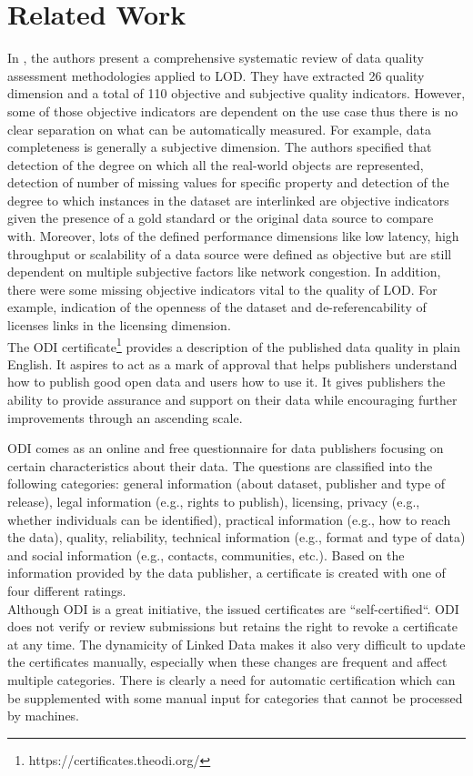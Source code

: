 \documentclass[onecolumn, crcready]{iosart2c}
\begin{document}
\section{Related Work}

In \cite{Framework2012}, the authors present a comprehensive systematic review of data quality assessment methodologies applied to LOD. They have extracted 26 quality dimension and a total of 110 objective and subjective quality indicators. However, some of those objective indicators are dependent on the use case thus there is no clear separation on what can be automatically measured. For example, data completeness is generally a subjective dimension. The authors specified that detection of the degree on which all the real-world objects are represented, detection of number of missing values for specific property and detection of the degree to which instances in the dataset are interlinked are objective indicators given the presence of a gold standard or the original data source to compare with. Moreover, lots of the defined performance dimensions like low latency, high throughput or scalability of a data source were defined as objective but are still dependent on multiple subjective factors like network congestion. In addition, there were some missing objective indicators vital to the quality of LOD. For example, indication of the openness of the dataset and de-referencability of licenses links in the licensing dimension.\\

The ODI certificate\footnote {https://certificates.theodi.org/} provides a description of the published data quality in plain English. It aspires to act as a mark of approval that helps publishers understand how to publish good open data and users how to use it. It gives publishers the ability to provide assurance and support on their data while encouraging further improvements through an ascending scale.

ODI comes as an online and free questionnaire for data publishers focusing on certain characteristics about their data. The questions are classified into the following categories: general information (about dataset, publisher and type of release), legal information (e.g., rights to publish), licensing, privacy (e.g., whether individuals can be identified), practical information (e.g., how to reach the data), quality, reliability, technical information (e.g., format and type of data) and social information (e.g., contacts, communities, etc.). Based on the information provided  by the data  publisher,  a certificate  is created  with one of four different ratings.\\
Although ODI is a great initiative, the issued certificates are “self-certified“. ODI does not verify or review submissions but retains the right to revoke a certificate at any time. The dynamicity of Linked Data  makes it also very difficult to update the certificates manually, especially when these changes are frequent and affect multiple categories. There is clearly a need for automatic certification which can be supplemented with some manual input for categories that cannot be processed by machines.\\
\end{document}
